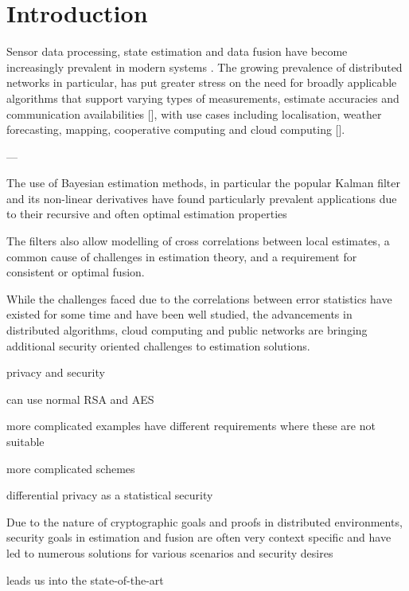 
\chapter{Introduction}
Sensor data processing, state estimation and data fusion have become increasingly prevalent in modern systems \cite{ligginsDistributedDataFusion2012}. The growing prevalence of distributed networks in particular, has put greater stress on the need for broadly applicable algorithms that support varying types of measurements, estimate accuracies and communication availabilities [], with use cases including localisation, weather forecasting, mapping, cooperative computing and cloud computing [].




---

The use of Bayesian estimation methods, in particular the popular Kalman filter and its non-linear derivatives have found particularly prevalent applications due to their recursive and often optimal estimation properties 

The filters also allow modelling of cross correlations between local estimates, a common cause of challenges in estimation theory, and a requirement for consistent or optimal fusion.

While the challenges faced due to the correlations between error statistics have existed for some time and have been well studied, the advancements in distributed algorithms, cloud computing and public networks are bringing additional security oriented challenges to estimation solutions.

privacy and security 

can use normal RSA and AES

more complicated examples have different requirements where these are not suitable

more complicated schemes

differential privacy as a statistical security

Due to the nature of cryptographic goals and proofs in distributed environments, security goals in estimation and fusion are often very context specific and have led to numerous solutions for various scenarios and security desires

leads us into the state-of-the-art

% 
%                                             
%                                             
%                                             
% 
